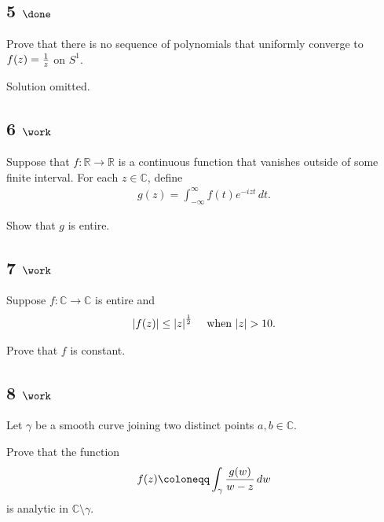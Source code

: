 \hypertarget{done}{%
\subsection{\texorpdfstring{5
\(\done\)}{5 \textbackslash done}}\label{done}}

Prove that there is no sequence of polynomials that uniformly converge
to \(f(z) = {1\over z}\) on \(S^1\).

Solution omitted.

\hypertarget{work-32}{%
\subsection{\texorpdfstring{6
\(\work\)}{6 \textbackslash work}}\label{work-32}}

Suppose that \(f: {\mathbb{R}}\to{\mathbb{R}}\) is a continuous function
that vanishes outside of some finite interval. For each
\(z\in {\mathbb{C}}\), define
\begin{align*}
g(z) = \int_{-\infty}^\infty f(t) e^{-izt} \,dt
.\end{align*}

Show that \(g\) is entire.

\hypertarget{work-33}{%
\subsection{\texorpdfstring{7
\(\work\)}{7 \textbackslash work}}\label{work-33}}

Suppose \(f: {\mathbb{C}}\to {\mathbb{C}}\) is entire and
\begin{align*}
{\left\lvert {f(z)} \right\rvert} \leq {\left\lvert {z} \right\rvert}^{1\over 2} \quad\text{ when } {\left\lvert {z} \right\rvert} > 10
.\end{align*}

Prove that \(f\) is constant.

\hypertarget{work-34}{%
\subsection{\texorpdfstring{8
\(\work\)}{8 \textbackslash work}}\label{work-34}}

Let \(\gamma\) be a smooth curve joining two distinct points
\(a, b\in {\mathbb{C}}\).

Prove that the function
\begin{align*}
f(z) \coloneqq\int_\gamma {g(w) \over w-z} \,dw
\end{align*}
is analytic in \({\mathbb{C}}\setminus\gamma\).


